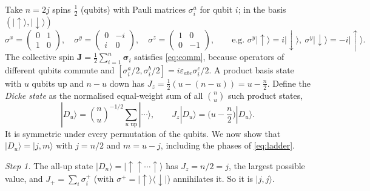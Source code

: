 \documentclass[11pt,a4paper]{article}
\newcommand{\vJ}{\bm{J}}
\newcommand{\up}{{\uparrow}}
\newcommand{\dn}{{\downarrow}}
\begin{document}
Take $n = 2j$ spins $\frac12$ (qubits) with Pauli matrices $\sigma^a_i$ for qubit $i$; in the basis $(|\up\rangle,
|\dn\rangle)$
\begin{equation}\label{eq:pauli}
  \sigma^x = \begin{pmatrix}0&1\\1&0\end{pmatrix},\quad
  \sigma^y = \begin{pmatrix}0&-i\\i&0\end{pmatrix},\quad
  \sigma^z = \begin{pmatrix}1&0\\0&-1\end{pmatrix},
  \qquad\text{e.g. } \sigma^y|\up\rangle = i|\dn\rangle,\ \sigma^y|\dn\rangle = -i|\up\rangle .
\end{equation}
The collective spin $\vJ = \frac12\sum_{i=1}^{n}\bm\sigma_i$ satisfies \eqref{eq:comm}, because operators of different
qubits commute and $[\sigma^a_i/2,\sigma^b_i/2] = i\varepsilon_{abc}\sigma^c_i/2$.
A product basis state with $u$ qubits up and $n-u$ down has $J_z = \frac12(u - (n-u)) = u - \frac n2$. Define the
\emph{Dicke state} as the normalised equal-weight sum of all $\binom{n}{u}$ such product states,
\begin{equation}\label{eq:dicke-abstract}
  |D_u\rangle = \binom{n}{u}^{-1/2}\sum_{\text{$u$ up}}|\cdots\rangle ,\qquad J_z|D_u\rangle = \Big(u-\frac n2\Big)|D_u\rangle .
\end{equation}
It is symmetric under every permutation of the qubits. We now show that $|D_u\rangle = |j,m\rangle$ with $j = n/2$ and
$m = u - j$, including the phases of \eqref{eq:ladder}.

\emph{Step 1.} The all-up state $|D_n\rangle = |\up\up\cdots\up\rangle$ has $J_z = n/2 = j$, the largest possible
value, and $J_+ = \sum_i\sigma^+_i$ (with $\sigma^+ = |\up\rangle\langle\dn|$) annihilates it. So it is $|j,j\rangle$.
\end{document}
